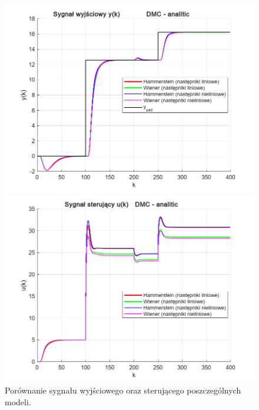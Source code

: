\documentclass[a4paper,titlepage,11pt,floatssmall]{mwrep}
\begin{document}
\begin{figure}[p]
\centering
\begin{minipage}{0.495\linewidth}
    \centering
    \includegraphics[width=1.1\linewidth]{pictures/DMC_analitic_y}
\end{minipage}
\hfill
\begin{minipage}{0.495\linewidth}
    \centering
    \includegraphics[width=1.1\linewidth]{pictures/DMC_analitic_u}
\end{minipage}

\caption{Porównanie sygnału wyjściowego oraz sterującego poszczególnych modeli.}

\vspace{2cm}


\end{figure}
\end{document}
